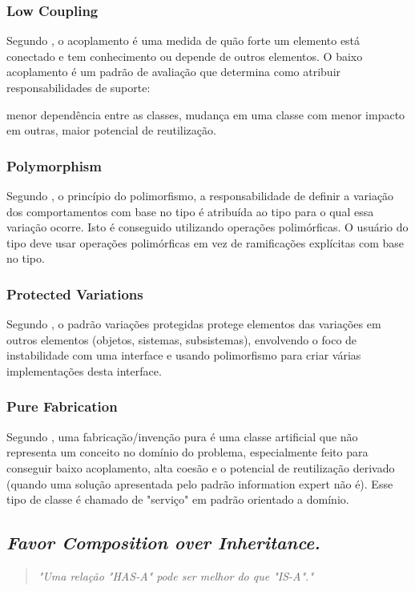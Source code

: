\documentclass[12pt]{article}
\begin{document}
\subsubsection{Low Coupling} \label{sec:grasp}

Segundo \cite{CRAIG_LARMAN}, o acoplamento é uma medida de quão forte um elemento está conectado e tem conhecimento ou depende de outros elementos. O baixo acoplamento é um padrão de avaliação que determina como atribuir responsabilidades de suporte:

menor dependência entre as classes,
mudança em uma classe com menor impacto em outras,
maior potencial de reutilização.

\subsubsection{Polymorphism} \label{sec:grasp}

Segundo \cite{CRAIG_LARMAN}, o princípio do polimorfismo, a responsabilidade de definir a variação dos comportamentos com base no tipo é atribuída ao tipo para o qual essa variação ocorre. Isto é conseguido utilizando operações polimórficas. O usuário do tipo deve usar operações polimórficas em vez de ramificações explícitas com base no tipo.


\subsubsection{Protected Variations} \label{sec:grasp}

Segundo \cite{CRAIG_LARMAN}, o padrão variações protegidas protege elementos das variações em outros elementos (objetos, sistemas, subsistemas), envolvendo o foco de instabilidade com uma interface e usando polimorfismo para criar várias implementações desta interface.

\subsubsection{Pure Fabrication} \label{sec:grasp}

Segundo \cite{CRAIG_LARMAN}, uma fabricação/invenção pura é uma classe artificial que não representa um conceito no domínio do problema, especialmente feito para conseguir baixo acoplamento, alta coesão e o potencial de reutilização derivado (quando uma solução apresentada pelo padrão information expert não é). Esse tipo de classe é chamado de "serviço" em padrão orientado a domínio.


\subsection{\textit{Favor Composition over Inheritance.}} \label{sec:favor_composition}
\begin{quote}
\textit{"Uma relação "HAS-A" pode ser melhor do que "IS-A"."}\cite{HEADFIRST_DESIGN_PATTERN}
\end{quote}
\end{document}
